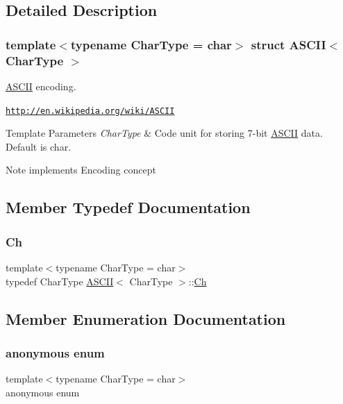 \subsection{Detailed Description}
\subsubsection*{template$<$typename Char\+Type = char$>$\newline
struct A\+S\+C\+I\+I$<$ Char\+Type $>$}

\hyperlink{structASCII}{A\+S\+C\+II} encoding. 

\href{http://en.wikipedia.org/wiki/ASCII}{\tt http\+://en.\+wikipedia.\+org/wiki/\+A\+S\+C\+II} 
\begin{DoxyTemplParams}{Template Parameters}
{\em Char\+Type} & Code unit for storing 7-\/bit \hyperlink{structASCII}{A\+S\+C\+II} data. Default is char. \\
\hline
\end{DoxyTemplParams}
\begin{DoxyNote}{Note}
implements Encoding concept 
\end{DoxyNote}


\subsection{Member Typedef Documentation}
\mbox{\label{structASCII_a1baf6e7914f165be952c30db664cefb4}} 
\subsubsection{\texorpdfstring{Ch}{Ch}}
{\footnotesize\ttfamily template$<$typename Char\+Type  = char$>$ \\
typedef Char\+Type \hyperlink{structASCII}{A\+S\+C\+II}$<$ Char\+Type $>$\+::\hyperlink{structASCII_a1baf6e7914f165be952c30db664cefb4}{Ch}}



\subsection{Member Enumeration Documentation}
\mbox{\label{structASCII_a59193e2783f1ec8e2c4c99a265c5c856}} 
\subsubsection{\texorpdfstring{anonymous enum}{anonymous enum}}
{\footnotesize\ttfamily template$<$typename Char\+Type  = char$>$ \\
anonymous enum}


